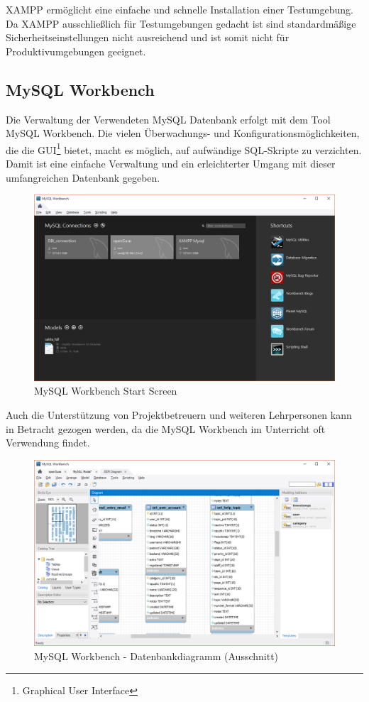 	\newpage
	XAMPP ermöglicht eine einfache und schnelle Installation einer Testumgebung. Da XAMPP ausschließlich für Testumgebungen gedacht ist sind standardmäßige Sicherheitseinstellungen nicht ausreichend und ist somit nicht für Produktivumgebungen geeignet.
	
	
	\subsection{MySQL Workbench}
	Die Verwaltung der Verwendeten MySQL Datenbank erfolgt mit dem Tool MySQL Workbench. Die vielen Überwachungs- und Konfigurationsmöglichkeiten, die die GUI\footnote{Graphical User Interface} bietet, macht es möglich, auf aufwändige SQL-Skripte zu verzichten. Damit ist eine einfache Verwaltung und ein erleichterter Umgang mit dieser umfangreichen Datenbank gegeben.
	
	\begin{figure}[h]
		\centering
		\includegraphics[scale=.5]{figures/workbench_startgui.png}
		\caption{MySQL Workbench Start Screen}
		\label{Worbench_Startgui}
	\end{figure}

	Auch die Unterstützung von Projektbetreuern und weiteren Lehrpersonen kann in Betracht gezogen werden, da die MySQL Workbench im Unterricht oft Verwendung findet.
	
	\newpage

	\begin{figure}[h]
		\centering
		\includegraphics[scale=.5]{figures/workbench_reverse.png}
		\caption{MySQL Workbench - Datenbankdiagramm (Ausschnitt)}
		\label{Workbench_DiaGUI}
	\end{figure}
		
